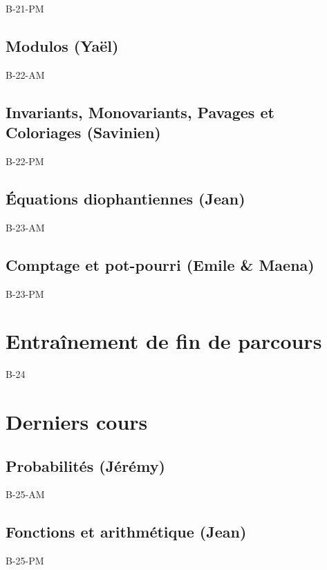 \documentclass[poly,trombi]{valbonne}
\begin{document}
{B-21-PM}

\subsection{Modulos (Yaël)}
{B-22-AM}

\subsection{Invariants, Monovariants, Pavages et Coloriages (Savinien)}

{B-22-PM}

\subsection{Équations diophantiennes (Jean)}

{B-23-AM}

\subsection{Comptage et pot-pourri (Emile \& Maena)}

{B-23-PM}


\section{Entraînement de fin de parcours}

{B-24}


\section{Derniers cours}

\subsection{Probabilités (Jérémy)}

{B-25-AM}

\subsection{Fonctions et arithmétique (Jean)}

{B-25-PM}



\end{document}
